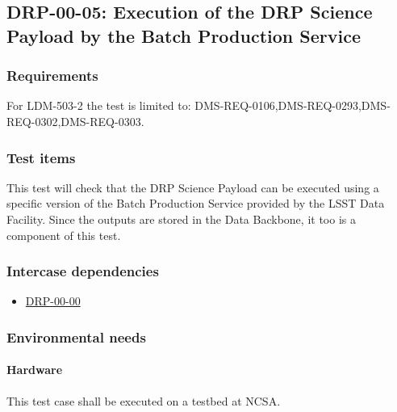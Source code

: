 \subsection{DRP-00-05: Execution of the DRP Science Payload by the Batch Production Service}
\label{drp-00-05}

\subsubsection{Requirements}

For LDM-503-2 the test is limited to: DMS-REQ-0106,DMS-REQ-0293,DMS-REQ-0302,DMS-REQ-0303.

\subsubsection{Test items}

This test will check that the DRP Science Payload can be executed
using a specific version of the Batch Production Service provided
by the LSST Data Facility.  Since the outputs are stored in the
Data Backbone, it too is a component of this test.

\subsubsection{Intercase dependencies}

\begin{itemize}

  \item{\hyperref[drp-00-00]{DRP-00-00}}

\end{itemize}

\subsubsection{Environmental needs}


\paragraph{Hardware}\label{sec:hardware}

This test case shall be executed on a testbed at NCSA.

